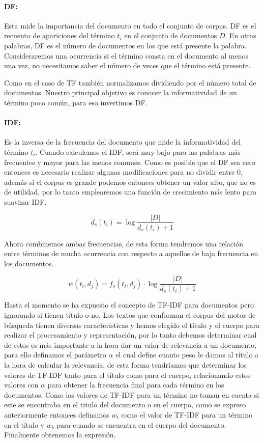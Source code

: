 \documentclass[runningheads,a4paper]{llncs}
\begin{document}
\paragraph*{DF:} Esta mide la importancia del documento en todo el conjunto de corpus. DF es el recuento de apariciones del término $t_i$ en el conjunto de documentos $D$. En otras palabras, DF es el número de documentos en los que está presente la palabra. Consideraremos una ocurrencia si el término consta en el documento al menos una vez, no necesitamos saber el número de veces que el término está presente. 

Como en el caso de TF también normalizamos dividiendo por el número total de documentos. Nuestro principal objetivo es conocer la informatividad de un término poco común, para eso invertimos DF.

\paragraph*{IDF:} Es la inversa de la frecuencia del documento que mide la informatividad del término $t_i$. Cuando calculemos el IDF, será muy bajo para las palabras más frecuentes y mayor para las menos comunes. Como es posible que el DF sea cero entonces es necesario realizar algunas modificaciones para no dividir entre 0, además si el corpus es grande podemos entonces obtener un valor alto, que no es de utilidad, por lo tanto emplearemos  una función de crecimiento más lento para suavizar IDF.

\begin{equation}
	\overline{d}_s(t_i) = \log{\frac{|D|}{d_s(t_i) + 1}}
\end{equation}

Ahora combinemos ambas frecuencias, de esta forma tendremos una relación entre términos de mucha ocurrencia con respecto a aquellos de baja frecuencia en los documentos.

\begin{equation}
	w(t_i, d_j) = f_s(t_i, d_j) \cdot \log{\frac{|D|}{d_s(t_i) + 1}}
\end{equation}

Hasta el momento se ha expuesto el concepto de TF-IDF para documentos pero ignorando si tienen título o no. Los textos que conforman el corpus del motor de búsqueda tienen diversas características y hemos elegido el título y el cuerpo para realizar el procesamiento y representación, por lo tanto debemos determinar cual de estos es más importante a la hora  dar un valor de relevancia a un documento, para ello definamos el parámetro $\alpha$ el cual define cuanto peso le damos al título a la hora de calcular la relevancia, de esta forma tendríamos que determinar los valores de TF-IDF tanto para el título como para el cuerpo, relacionando estos valores con $\alpha$ para obtener la frecuencia final para cada término en los documentos. Como los valores de TF-IDF para un término no toman en cuenta si este se encontraba en el titulo del documento o en el cuerpo, como se expreso anteriormente entonces definamos $w_t$ como el valor de TF-IDF para un término en el título y $w_b$ para cuando se encuentra en el cuerpo del documento. Finalmente obtenemos la expresión.
\end{document}
